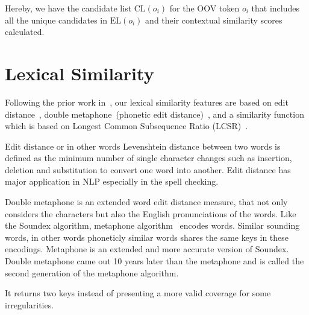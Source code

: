 \documentclass[a4paper,onesided,12pt]{report}
\begin{document}
Hereby, we have the candidate list $\text{CL}(o_{i})$ for the OOV token $o_i$ that includes all the unique candidates in $\text{EL}(o_{i})$ and their contextual similarity scores calculated.

\section{Lexical Similarity}

Following the prior work in~\cite{Han:2011:LNS:2002472.2002520,DBLP:conf/acl/HassanM13}, our lexical similarity features are based on edit distance~\cite{levenshtein1966bcc}, double metaphone~(phonetic edit distance)~\cite{Philips:2000:DMS:349124.349132}, and a similarity function~\cite{Contractor:2010:UCN:1944566.1944588} which is based on Longest Common Subsequence Ratio (LCSR)~\cite{melamed1999bitext}.

Edit distance or in other words Levenshtein distance between two words is defined as the minimum number of single character changes such as insertion, deletion and substitution to convert one word into another. Edit distance has major application in NLP especially in the spell checking.

Double metaphone is an extended word edit distance measure, that not only considers the characters but also the English pronunciations of the words. Like the Soundex algorithm, metaphone algorithm~\cite{philips1990hanging} encodes words. Similar sounding words, in other words phoneticly similar words shares the same keys in these encodings. Metaphone is an extended and more accurate version of Soundex. Double metaphone came out 10 years later than the metaphone and is called the second generation of the metaphone algorithm.

It returns two keys instead of presenting a more valid coverage for some irregularities. %
\end{document}
